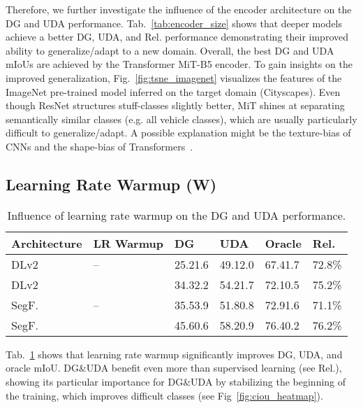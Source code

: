 \documentclass[journal,compsoc]{IEEEtran}
\newcommand*{\cm}{\checkmark}
\newcommand{\spm}[1]{\tiny{#1}}
\begin{document}
Therefore, we further investigate the influence of the encoder architecture on the DG and UDA performance. Tab.~\ref{tab:encoder_size} shows that deeper models achieve a better DG, UDA, and Rel. performance demonstrating their improved ability to generalize/adapt to a new domain.
Overall, the best DG and UDA mIoUs are achieved by the Transformer MiT-B5 encoder. 
To gain insights on the improved generalization, Fig.~\ref{fig:tsne_imagenet} visualizes the features of the ImageNet pre-trained model inferred on the target domain (Cityscapes). Even though ResNet structures stuff-classes slightly better, MiT shines at separating semantically similar classes (e.g. all vehicle classes), which are usually particularly difficult to generalize/adapt. A possible explanation might be the texture-bias of CNNs and the shape-bias of Transformers~\cite{bhojanapalli2021understanding}.

\subsection{Learning Rate Warmup (W)}
\label{sec:exp_lr_warmup}

\begin{table}
\centering
\caption{Influence of learning rate warmup on the DG and UDA performance.}
\label{tab:warmup}
\setlength{\tabcolsep}{3pt}
\footnotesize
\begin{tabular}{llllll}
\toprule
Architecture & LR Warmup &           DG & UDA &         Oracle &   Rel. \\
\midrule
    DLv2~\cite{chen2017deeplab} &      -- & 25.2\spm{1.6} & 49.1\spm{2.0} & 67.4\spm{1.7} & 72.8\% \\
    DLv2~\cite{chen2017deeplab} &     \cm & 34.3\spm{2.2} & 54.2\spm{1.7} & 72.1\spm{0.5} & 75.2\% \\
    SegF.~\cite{xie2021segformer} &    -- & 35.5\spm{3.9} & 51.8\spm{0.8} & 72.9\spm{1.6} & 71.1\% \\
    SegF.~\cite{xie2021segformer} &   \cm & 45.6\spm{0.6} & 58.2\spm{0.9} & 76.4\spm{0.2} & 76.2\% \\
\bottomrule
\end{tabular}
\end{table} 
Tab.~\ref{tab:warmup} shows that learning rate warmup significantly improves DG, UDA, and oracle mIoU. 
DG\&UDA benefit even more than supervised learning (see Rel.), showing its particular importance for DG\&UDA by stabilizing the beginning of the training, which improves difficult classes (see Fig~\ref{fig:ciou_heatmap}).
\end{document}
